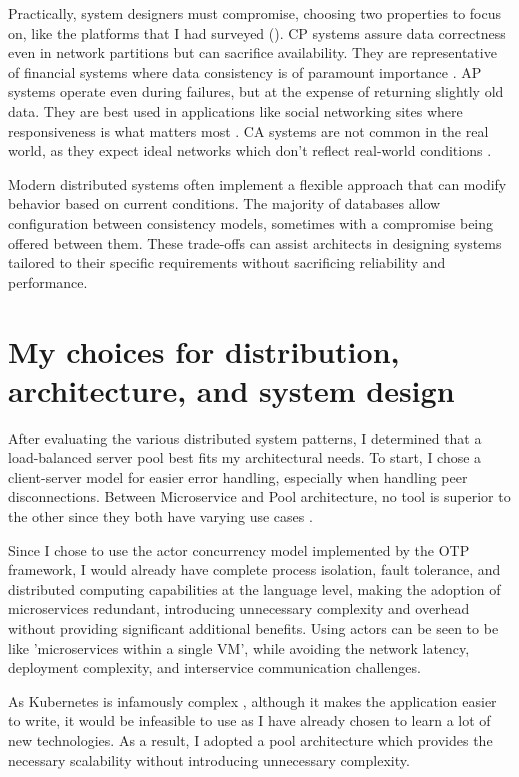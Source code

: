 \documentclass[]{final}
\begin{document}
Practically, system designers must compromise, choosing two properties to focus
on, like the platforms that I had surveyed {\hypersetup{linkcolor=teal}(\pageref{survey})}.
CP systems assure data correctness even in network partitions but
can sacrifice availability. They are representative of financial systems
where data consistency is of paramount importance \cite{noauthor_cap_nodate}. AP systems operate even
during failures, but at the expense of returning slightly old data. They
are best used in applications like social networking sites where
responsiveness is what matters most \cite{noauthor_cap_nodate}. CA systems are not common in the
real world, as they expect ideal networks which don't reflect
real-world conditions \cite{noauthor_cap_nodate}.

Modern distributed systems often implement a flexible approach that can modify
behavior based on current conditions. The majority of databases allow
configuration between consistency models, sometimes with a compromise being
offered between them. These trade-offs can assist architects in designing
systems tailored to their specific requirements without sacrificing
reliability and performance.

\section{My choices for distribution, architecture, and system design}

After evaluating the various distributed system patterns,
I determined that a load-balanced server pool best fits my architectural
needs. To start, I chose a client-server model for easier error handling,
especially when handling peer disconnections. Between Microservice and Pool
architecture, no tool is superior to the other
since they both have varying use cases \cite{cubet_microservice_nodate}.

Since I chose to use the actor concurrency model implemented by the OTP
framework, I would already have complete process isolation, fault tolerance,
and distributed computing capabilities at the language level, making
the adoption of microservices redundant, introducing unnecessary complexity
and overhead without providing significant additional benefits.
Using actors can be seen to be like 'microservices within a single VM', while
avoiding the network latency, deployment complexity, and interservice
communication challenges.

As Kubernetes is infamously complex \cite{noauthor_why_nodate}, although it makes the application easier
to write, it would be infeasible to use as I have already chosen to learn a
lot of new technologies. As a result, I adopted a pool architecture which
provides the necessary scalability without introducing unnecessary complexity.
\end{document}
